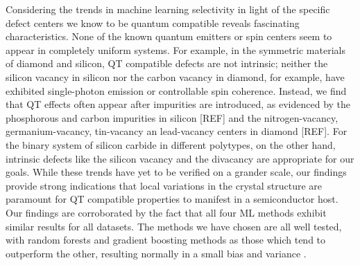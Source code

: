 \documentclass[superscriptaddress,unsortedaddress,
 amsmath,amssymb,
 aps,
]{revtex4-2}
\begin{document}
Considering the trends in machine learning selectivity in light of the specific defect centers we know to be quantum compatible reveals fascinating characteristics. None of the known quantum emitters or spin centers seem to appear in completely uniform systems. For example, in the symmetric materials of diamond and silicon, QT compatible defects are not intrinsic; neither the silicon vacancy in silicon nor the carbon vacancy in diamond, for example,  have exhibited single-photon emission or controllable spin coherence. Instead, we find that QT effects often appear after impurities are introduced, as evidenced by the phosphorous and carbon impurities in silicon [REF] and the nitrogen-vacancy, germanium-vacancy, tin-vacancy an lead-vacancy centers in diamond [REF]. 
For the binary system of silicon carbide in different polytypes, on the other hand, intrinsic defects like the silicon vacancy and the divacancy are appropriate for our goals. 
While these trends have yet to be verified on a grander scale, our findings provide strong indications that local variations in the crystal structure are paramount for QT  compatible properties to manifest in a semiconductor host. 
Our findings are corroborated by the fact that all four ML methods exhibit similar results for all datasets. The methods we have chosen are all well tested, with random forests and gradient boosting methods as those which tend to outperform the other, resulting normally in a small bias and variance \cite{Hastie2009,Mehta2019,Murphy2012}.


\end{document}
